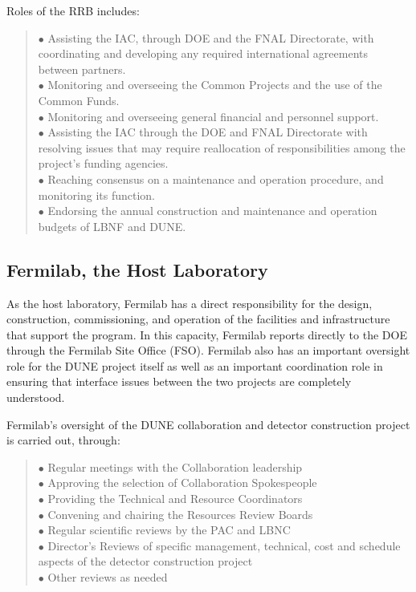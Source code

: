 Roles of the RRB includes:

\begin{quote}
$\bullet$ Assisting the IAC, through DOE and the FNAL Directorate,
with coordinating and developing any required international
agreements between partners.\\
$\bullet$ Monitoring and overseeing the Common Projects and the
use of the Common Funds.\\
$\bullet$ Monitoring and overseeing general financial and personnel support.\\
$\bullet$ Assisting the IAC through the DOE and FNAL Directorate
with resolving issues that may require reallocation of responsibilities
among the project’s funding agencies.\\
$\bullet$ Reaching consensus on a maintenance and operation procedure,
and monitoring its function.\\
$\bullet$ Endorsing the annual construction and maintenance and operation
budgets of LBNF and DUNE.\\
\end{quote}

\subsection{Fermilab, the Host Laboratory}

As the host laboratory, Fermilab has a direct responsibility for the design,
construction, commissioning, and operation of the facilities and
infrastructure that support the program.  In this capacity, Fermilab reports
directly to the DOE through the Fermilab Site Office (FSO).
Fermilab also has an important oversight role for the DUNE project
itself as well as an important coordination role in ensuring that
interface issues between the two projects are completely understood.

Fermilab's oversight of the DUNE collaboration and detector
construction project is carried out, through:
\begin{quote}
$\bullet$ Regular meetings with the Collaboration leadership\\
$\bullet$ Approving the selection of Collaboration Spokespeople\\
$\bullet$ Providing the Technical and Resource Coordinators\\
$\bullet$ Convening and chairing the Resources Review Boards\\
$\bullet$ Regular scientific reviews by the PAC and LBNC\\
$\bullet$ Director’s Reviews of specific management, technical,
cost and schedule aspects of the detector construction project\\
$\bullet$ Other reviews as needed
\end{quote}

